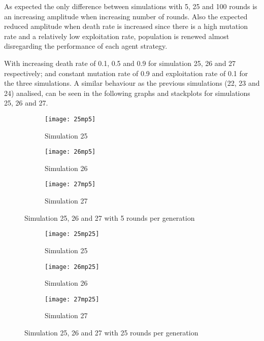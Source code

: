 As expected the only difference between simulations with 5, 25 and 100 rounds is an increasing amplitude when increasing number of rounds. Also the expected reduced amplitude when death rate is increased since there is a high mutation rate and a relatively low exploitation rate, population is renewed almost disregarding the performance of each agent strategy.

With increasing death rate of 0.1, 0.5 and 0.9 for simulation 25, 26 and 27 respectively; and constant mutation rate of 0.9 and exploitation rate of 0.1 for the three simulations. A similar behaviour as the previous simulations (22, 23 and 24) analised, can be seen in the following graphs and stackplots for simulations 25, 26 and 27.

\begin{figure}[H]       
    \centering
    \begin{subfigure}[b]{0.3\textwidth}
	\centering
	{\texttt{[image: 25mp5]}}   
    	\caption{Simulation 25}
	\label{fig:mpsim255}
    \end{subfigure}
    \hfill
    \begin{subfigure}[b]{0.3\textwidth}
	\centering
	{\texttt{[image: 26mp5]}}   
    	\caption{Simulation 26}
	\label{fig:mpsim265}
    \end{subfigure}
    \hfill
    \begin{subfigure}[b]{0.3\textwidth}
	\centering
	{\texttt{[image: 27mp5]}}   
    	\caption{Simulation 27}
	\label{fig:mpsim275}
    \end{subfigure}
    \caption{Simulation 25, 26 and 27 with 5 rounds per generation}
    \label{mpsim252627simulations5}
\end{figure}

\begin{figure}[H]       
    \centering
    \begin{subfigure}[b]{0.3\textwidth}
	\centering
	{\texttt{[image: 25mp25]}}   
    	\caption{Simulation 25}
	\label{fig:mpsim2525}
    \end{subfigure}
    \hfill
    \begin{subfigure}[b]{0.3\textwidth}
	\centering
	{\texttt{[image: 26mp25]}}   
    	\caption{Simulation 26}
	\label{fig:mpsim2625}
    \end{subfigure}
    \hfill
    \begin{subfigure}[b]{0.3\textwidth}
	\centering
	{\texttt{[image: 27mp25]}}   
    	\caption{Simulation 27}
	\label{fig:mpsim2725}
    \end{subfigure}
    \caption{Simulation 25, 26 and 27 with 25 rounds per generation}
    \label{mpsim252627simulations25}
\end{figure}

